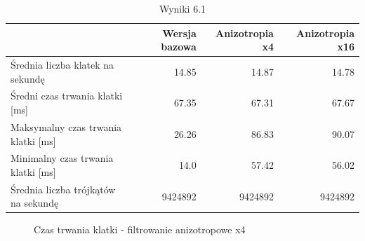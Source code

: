 \documentclass[a4paper,twoside,12pt]{book}
\begin{document}
\vbox{}

\begin{table}[H]
    \centering
    \caption{Wyniki 6.1}
    \label{tab:ani_test1}
    \begin{tabular}{|l||r|r|r|}
        \hline
        & Wersja bazowa & Anizotropia x4 & Anizotropia x16 \\
        \hline
        Średnia liczba klatek na sekundę & 14.85 & 14.87 & 14.78 \\
        \hline
        Średni czas trwania klatki [ms] & 67.35 & 67.31 & 67.67 \\
        \hline
        Maksymalny czas trwania klatki [ms] & 26.26 & 86.83 & 90.07 \\
        \hline
        Minimalny czas trwania klatki [ms] & 14.0 & 57.42 & 56.02 \\
        \hline
        Średnia liczba trójkątów na sekundę & 9424892 & 9424892 & 9424892 \\
        \hline
    \end{tabular}
\end{table}

\vbox{}

\begin{figure}[H]
\centering
{}

\caption{Czas trwania klatki - filtrowanie anizotropowe x4}
\label{fig:dynamic_plot_ani1_4}
\end{figure}

\vbox{}
\end{document}
